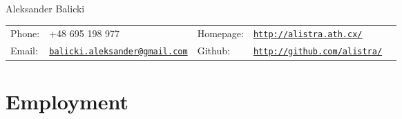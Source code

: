 \documentclass[letterpaper]{article}
\def\name{Aleksander Balicki}
\begin{document}
\centerline{\huge \name}

\vspace{0.25in}

\begin{tabularx}{\textwidth}{lXlll}
        Phone: 	& +48 695 198 977 & Homepage: & \href{http://alistra.ath.cx/}{\tt http://alistra.ath.cx/} \\
        Email: 	& \href{mailto:balicki.aleksander@gmail.com}{\tt balicki.aleksander@gmail.com}
        & Github: & \href{http://github.com/alistra/}{\tt http://github.com/alistra/}\\
    \end{tabularx}

\section*{Employment}
\end{document}
